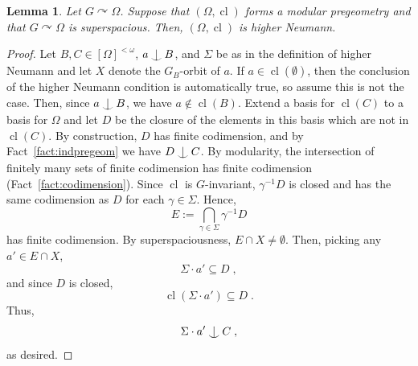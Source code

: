 \documentclass{article}
\newtheorem{lemma}[theorem]{Lemma}
\theoremstyle{remark}
\theoremstyle{definition}
\def\acts{\curvearrowright}
\newcommand{\remmic}[1]{\textcolor{orange}{MP: #1}}
\newcommand{\indep}[2]{%
  \mathrel{
    \mathop{
      \vcenter{
        \hbox{\oalign{\noalign{\kern-.3ex}\hfil$\vert$\rlap{$^\mathrm{#2}$}\hfil\cr
              \noalign{\kern-.7ex}
              $\smile$\cr\noalign{\kern-.3ex}}}
      }
    }\displaylimits_{#1}
  }
}
\DeclareMathOperator{\cl}{cl}
\DeclareMathOperator{\acl}{acl}
\def\Ind#1#2{#1\setbox0=\hbox{$#1x$}\kern\wd0\hbox to 0pt{\hss$#1\mid$\hss}
	\lower.9\ht0\hbox to 0pt{\hss$#1\smile$\hss}\kern\wd0}
\def\ind{\mathop{\mathpalette\Ind{}}}
\begin{document}
{\begin{lemma}\label{lem:nirvana}
    Let $G\acts\Omega$. Suppose that $(\Omega, \cl)$ forms a modular pregeometry and that $G\acts\Omega$ is superspacious. Then, $(\Omega, {\cl})$ is higher Neumann.
\end{lemma}
\begin{proof} Let $B, C\in[\Omega]^{<\omega}$, {$a\ind B$, and $\Sigma$} 
be as in the definition of higher Neumann and let $X$ denote the $G_B$-orbit of $a$. {If $a\in {\cl}(\emptyset)$, then the conclusion of the higher Neumann condition is {automatically} %
true, so assume this is not the case. Then, {since $a \ind B$,} we have $a\notin{\cl}(B)$.} Extend a basis for ${\cl}(C)$ to a basis for $\Omega$ and let $D$ be the closure of the elements in this basis which are not in ${\cl}(C)$. By construction, $D$ has finite codimension, and by Fact~\ref{fact:indpregeom} we have $D\ind C$. %
By modularity, the intersection of finitely many sets of finite codimension has finite codimension (Fact~\ref{fact:codimension}). {Since $\cl$ is $G$-invariant, $\gamma^{-1} D$ is closed and has the same codimension as $D$ for each $\gamma\in\Sigma$.} Hence, 
\[E:=\bigcap_{\gamma\in\Sigma} \gamma^{-1} D\]
has finite codimension. By  superspaciousness, $E\cap X\neq\emptyset$. Then, picking any $a'\in E\cap X$, %
\[
\Sigma \cdot a'\subseteq D\;,\]
and since $D$ is %
{closed,} 
\[{\cl}(\Sigma\cdot  a')\subseteq D\;.\]
 Thus, 
\[
\Sigma \cdot a'\ind C\;,\]
as desired.
\end{proof}

}
\end{document}
